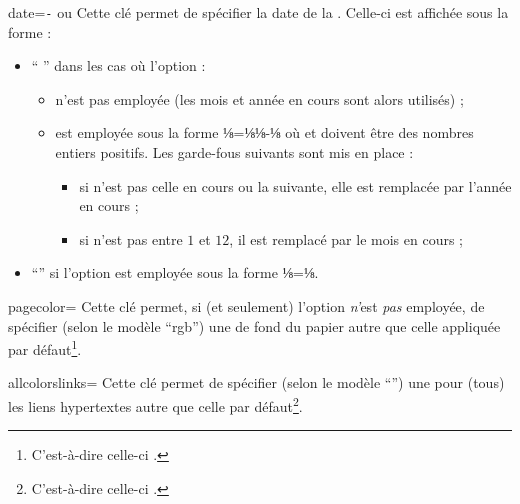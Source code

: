 \documentclass{letgut}
\begin{document}
{%
  \begin{docKey}{date}{=\texttt{-} ou }{}
    Cette clé permet de spécifier la date de la . Celle-ci est affichée sous
    la forme :
    \begin{itemize}
    \item \enquote{ } dans les cas où l'option :
      \begin{itemize}
      \item n'est pas employée (les mois et année en cours sont alors
        utilisés) ;
      \item est employée sous la forme ⅛=⅛⅛-⅛
        où  et  doivent être des nombres entiers
        positifs. Les garde-fous suivants sont mis en place :
        \begin{itemize}
        \item si  n'est pas celle en cours ou la suivante, elle est
          remplacée par l'année en cours ;
        \item si  n'est pas entre $1$ et $12$, il est remplacé par le
          mois en cours ;
        \end{itemize}
      \end{itemize}
    \item \enquote{} si l'option est employée sous la forme
      ⅛=⅛.
    \end{itemize}
  \end{docKey}
}

\begin{docKey}{pagecolor}{=}{}
  Cette clé permet, si (et seulement) l'option  \emph{n'}est
  \emph{pas} employée, de spécifier (selon le modèle \enquote{rgb}) une
   de fond du papier autre que celle appliquée par
  défaut\footnote{C'est-à-dire \colorbox{letgutdefaultpagecolor}{celle-ci}%
    .}.
\end{docKey}

\begin{docKey}{allcolorslinks}{=}{}
  Cette clé permet de spécifier (selon le modèle \enquote{})
  une  pour (tous) les liens hypertextes autre que celle
   par défaut\footnote{C'est-à-dire
    \textcolor{letgut_allcolors_links}{celle-ci}%
    .}.
\end{docKey}
\end{document}
